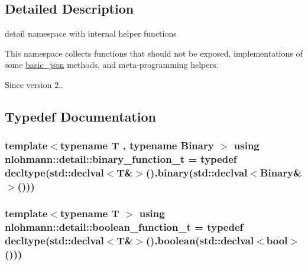\subsection{Detailed Description}
detail namespace with internal helper functions 

This namespace collects functions that should not be exposed, implementations of some \hyperlink{classnlohmann_1_1basic__json}{basic\+\_\+json} methods, and meta-\/programming helpers.

\begin{DoxySince}{Since}
version 2.. 
\end{DoxySince}


\subsection{Typedef Documentation}
\subsubsection[{\texorpdfstring{binary\+\_\+function\+\_\+t}{binary_function_t}}]{\setlength{\rightskip}{0pt plus 5cm}template$<$typename T , typename Binary $>$ using {\bf nlohmann\+::detail\+::binary\+\_\+function\+\_\+t} = typedef decltype(std\+::declval$<$T\&$>$().binary(std\+::declval$<$Binary\&$>$()))}\hypertarget{namespacenlohmann_1_1detail_a4948bef216c2594dae7921d9c4045455}{}\label{namespacenlohmann_1_1detail_a4948bef216c2594dae7921d9c4045455}
\subsubsection[{\texorpdfstring{boolean\+\_\+function\+\_\+t}{boolean_function_t}}]{\setlength{\rightskip}{0pt plus 5cm}template$<$typename T $>$ using {\bf nlohmann\+::detail\+::boolean\+\_\+function\+\_\+t} = typedef decltype(std\+::declval$<$T\&$>$().boolean(std\+::declval$<$bool$>$()))}\hypertarget{namespacenlohmann_1_1detail_a45ec87326503b8884b664a9ef23a6c99}{}\label{namespacenlohmann_1_1detail_a45ec87326503b8884b664a9ef23a6c99}
